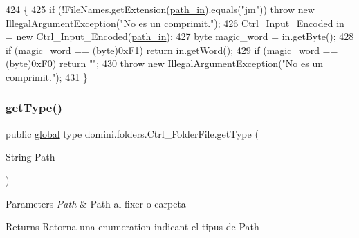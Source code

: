 \begin{DoxyCode}
424                                         \{
425         \textcolor{keywordflow}{if} (!FileNames.getExtension(\hyperlink{classdomini_1_1folders_1_1Ctrl__FolderFile_a0d3946bb2832a1f34d0c2227df5c71c4}{path\_in}).equals(\textcolor{stringliteral}{"jm"})) \textcolor{keywordflow}{throw} \textcolor{keyword}{new} IllegalArgumentException(\textcolor{stringliteral}{"No es
       un comprimit."});
426         Ctrl\_Input\_Encoded in = \textcolor{keyword}{new} Ctrl\_Input\_Encoded(\hyperlink{classdomini_1_1folders_1_1Ctrl__FolderFile_a0d3946bb2832a1f34d0c2227df5c71c4}{path\_in});
427         byte magic\_word = in.getByte();
428         \textcolor{keywordflow}{if} (magic\_word == (byte)0xF1) \textcolor{keywordflow}{return} in.getWord();
429         \textcolor{keywordflow}{if} (magic\_word == (byte)0xF0) \textcolor{keywordflow}{return} \textcolor{stringliteral}{""};
430         \textcolor{keywordflow}{throw} \textcolor{keyword}{new} IllegalArgumentException(\textcolor{stringliteral}{"No es un comprimit."});
431     \}
\end{DoxyCode}
\mbox{\label{classdomini_1_1folders_1_1Ctrl__FolderFile_a9e2ef751bdcb99083831c6b4e4761169}} 
\subsubsection{\texorpdfstring{get\+Type()}{getType()}}
{\footnotesize\ttfamily public \hyperlink{classglobal_1_1global}{global} type domini.\+folders.\+Ctrl\+\_\+\+Folder\+File.\+get\+Type (\begin{DoxyParamCaption}\item[{String}]{Path }\end{DoxyParamCaption})\hspace{0.3cm}{\ttfamily [inline]}}


\begin{DoxyParams}{Parameters}
{\em Path} & Path al fixer o carpeta \\
\hline
\end{DoxyParams}
\begin{DoxyReturn}{Returns}
Retorna una enumeration indicant el tipus de Path 
\end{DoxyReturn}

